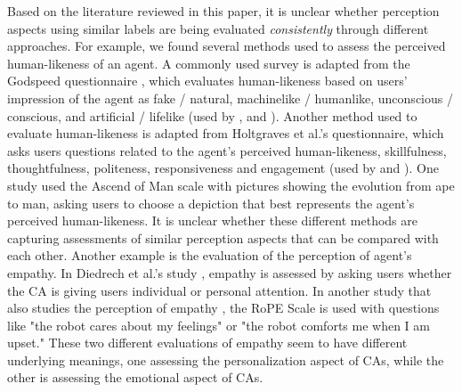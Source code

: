 Based on the literature reviewed in this paper, it is unclear whether perception aspects using similar labels are being evaluated \textit{consistently} through different approaches. For example, we found several methods used to assess the perceived human-likeness of an agent. A commonly used survey is adapted from the Godspeed questionnaire \cite{bartneck2009measurement}, which evaluates human-likeness based on users' impression of the agent as fake / natural, machinelike / humanlike, unconscious / conscious, and artificial / lifelike (used by \cite{hoegen2019end}\cmt{[31]}, \cite{jeong2019exploring}\cmt{[10]} and \cite{ouchi2019should}\cmt{[59]}). Another method used to evaluate human-likeness is adapted from Holtgraves et al.'s \cite{holtgraves2007perceiving} questionnaire, which asks users questions related to the agent's perceived human-likeness, skillfulness, thoughtfulness, politeness, responsiveness and engagement (used by \cite{diederich2019emulating}\cmt{[25]} and  \cite{gnewuch2018faster}\cmt{[19]}). One study \cite{westerman2019believe}\cmt{[9]} used the Ascend of Man scale \cite{kteily2015ascent} with pictures showing the evolution from ape to man, asking users to choose a depiction that best represents the agent's perceived human-likeness. It is unclear whether these different methods are capturing assessments of similar perception aspects that can be compared with each other. Another example is the evaluation of the perception of agent's empathy. In Diedrech et al.'s study \cite{diederich2019emulating}\cmt{[25]}, empathy is assessed by asking users whether the CA is giving users individual or personal attention. In another study that also studies the perception of empathy \cite{daher2020empathic}\cmt{[58]}, the RoPE Scale \cite{charrier2019rope} is used with questions like "the robot cares about my feelings" or "the robot comforts me when I am upset." These two different evaluations of empathy seem to have different underlying meanings, one assessing the personalization aspect of CAs, while the other is assessing the emotional aspect of CAs.


